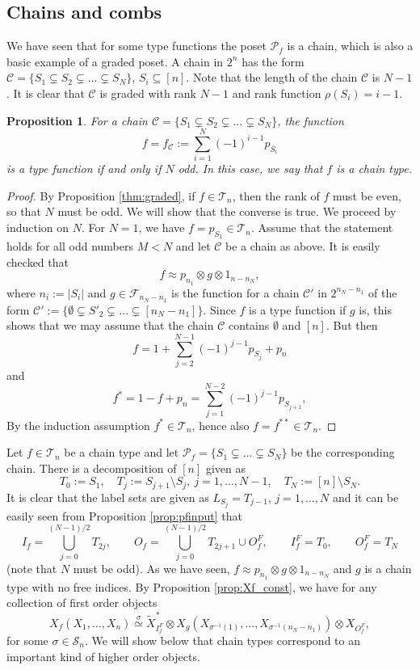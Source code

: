 \documentclass[12pt]{article}
\newtheorem{prop}{Proposition}
\theoremstyle{definition}
\theoremstyle{remark}
\def\Ce{\mathcal C}
\def\Te{\mathcal T}
\def\Fe{\mathcal F}
\def\Pe{\mathcal P}
\def\permut{\mathscr{S}}
\begin{document}
\subsection{Chains and combs}

 We have seen that for some type functions the poset $\Pe_f$ is a chain, which is also a
 basic example of a graded poset. A chain in $2^n$ has the form  $\Ce=\{S_1\subsetneq S_2\subsetneq \dots \subsetneq
S_N\}$, $S_i\subseteq [n]$. Note that the length of the chain $\Ce$ is $N-1$.
It is clear that  $\Ce$ is graded with rank $N-1$
and rank function $\rho(S_i)=i-1$. 

\begin{prop}\label{prop:chains} For a chain   $\Ce=\{S_1\subsetneq S_2\subsetneq \dots \subsetneq
S_N\}$, the function  
\[
f=f_\Ce:=\sum_{i=1}^N (-1)^{i-1} p_{S_i}
\]
is a type function if and only if $N$ odd. In this case, we say that $f$ is a chain type.

\end{prop}

\begin{proof}
By Proposition \ref{thm:graded}, if $f\in \Te_n$, then the rank of $f$ must be even, so
that $N$ must be odd. 
We will show that the converse is true. We proceed by induction on $N$. For $N=1$, we have
$f=p_{S_1}\in \Te_n$. Assume that the statement holds for all odd numbers $M<N$ and let
$\Ce$ be a chain as above. It is easily checked that   
\[
f\approx  p_{n_1}\otimes g\otimes 1_{n-n_N},
\]
where $n_i:=|S_i|$ and  $g\in
\Fe_{n_N-n_1}$ is the function for a chain $\Ce'$  in $2^{n_N-n_1}$ of the form $\Ce':=\{\emptyset\subsetneq S'_2\subsetneq \dots
\subsetneq [n_N-n_1]\}$. Since $f$ is a type function if $g$ is, this shows that we may assume that 
the chain $\Ce$ contains $\emptyset$ and $[n]$.  But then 
\[
f=1+\sum_{j=2}^{N-1} (-1)^{j-1}p_{S_j}+ p_{n} 
\]
and
\[
f^*=1-f+p_{n}=\sum_{j=1}^{N-2} (-1)^{j-1}p_{S_{j+1}},
\]
By the induction assumption $f^*\in \Te_n$, hence also $f=f^{**}\in
\Te_n$.
\end{proof}


Let $f\in \Te_n$ be a chain type and let $\Pe_f=\{S_1\subsetneq \dots \subsetneq
S_N\}$ be the corresponding chain. There is a decomposition of $[n]$ given as
\[
T_0:=S_1,\quad T_j:=S_{j+1}\setminus S_{j},\ j=1,\dots,N-1, \quad T_{N}:=[n]\setminus S_N.
\]
It is clear that the label sets are given as $L_{S_j}=T_{j-1}$, $j=1,\dots, N$ and
it can be easily seen from Proposition \ref{prop:pfinput} that 
\begin{equation}\label{eq:chain_io}
I_f=\bigcup_{j=0}^{(N-1)/2}{T_{2j}}, \qquad O_f=\bigcup_{j=0}^{(N-1)/2}{T_{2j+1}}\cup
O_f^F,\qquad I_f^F=T_0,\qquad O_f^F=T_{N}
\end{equation}
(note that $N$ must be odd).  As we have seen, $f\approx p_{n_1}\otimes g\otimes 1_{n-n_N}$
and $g$ is a chain type with no free indices. By Proposition \ref{prop:Xf_const}, we have 
for any collection of first order objects
\[
X_f(X_1,\dots,X_n)\overset{\sigma}{\simeq} \tilde X^*_{I_f^F}\otimes
X_g(X_{\sigma^{-1}(1)},\dots,X_{\sigma^{-1}(n_N-n_1)})\otimes X_{O_f^F},
\]
for some $\sigma\in \permut_n$. We will show below that chain types correspond to an
important kind of higher order objects.
\end{document}

